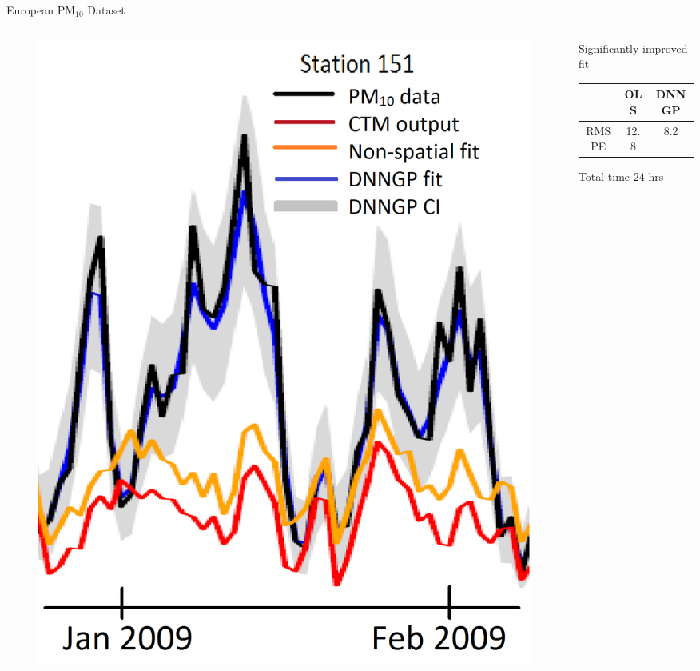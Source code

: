 \begin{frame}{European PM$_{10}$ Dataset}
\begin{columns}[T] %
\begin{column}{.48\textwidth}
\begin{figure}
\centering
\includegraphics[scale=0.15]{../figures/pm10test.png}
\end{figure}
\end{column}%
\hfill%
\begin{column}{.48\textwidth}
\vskip 8mm
\begin{itemize}
\myitem Significantly improved fit
\vskip 5mm
\begin{tabular}{c|c|c}
& OLS & DNNGP \\ \hline 
RMSPE & 12.8 & 8.2 
\end{tabular}
\vskip 1cm 
\myitem Total time $24$ hrs
\end{itemize}

\end{column}%
\end{columns}
\end{frame}

